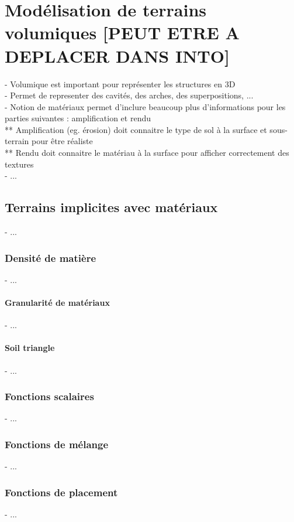 \chapter{Modélisation de terrains volumiques [PEUT ETRE A DEPLACER DANS INTO]}
\minitoc

- Volumique est important pour représenter les structures en 3D \\
- Permet de representer des cavités, des arches, des superpositions, ... \\
- Notion de matériaux permet d'inclure beaucoup plus d'informations pour les parties suivantes : amplification et rendu \\
** Amplification (eg. érosion) doit connaitre le type de sol à la surface et sous-terrain pour être réaliste \\
** Rendu doit connaitre le matériau à la surface pour afficher correctement des textures \\
- ...


\section{Terrains implicites avec matériaux}
- ...

\subsection{Densité de matière}
- ...

\subsubsection{Granularité de matériaux}
- ...

\subsubsection{Soil triangle}
- ...

\subsection{Fonctions scalaires}
- ...

\subsection{Fonctions de mélange}
- ...

\subsection{Fonctions de placement}
- ...

